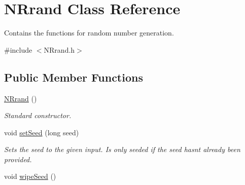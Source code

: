 \hypertarget{class_n_rrand}{}\section{N\+Rrand Class Reference}
\label{class_n_rrand}


Contains the functions for random number generation.  




{\ttfamily \#include $<$N\+Rrand.\+h$>$}

\subsection*{Public Member Functions}
\begin{DoxyCompactItemize}
\item 
\hyperlink{class_n_rrand_a674521c4c29a6cb692f343ea9cf6a40c}{N\+Rrand} ()\hypertarget{class_n_rrand_a674521c4c29a6cb692f343ea9cf6a40c}{}\label{class_n_rrand_a674521c4c29a6cb692f343ea9cf6a40c}

\begin{DoxyCompactList}\small\item\em Standard constructor. \end{DoxyCompactList}\item 
void \hyperlink{class_n_rrand_a23325b4d35ee0b5b580726db05e2b8a3}{set\+Seed} (long seed)
\begin{DoxyCompactList}\small\item\em Sets the seed to the given input. Is only seeded if the seed hasn\textquotesingle{}t already been provided. \end{DoxyCompactList}\item 
void \hyperlink{class_n_rrand_a34238557ccd72ee3e58712b7140a649a}{wipe\+Seed} ()\hypertarget{class_n_rrand_a34238557ccd72ee3e58712b7140a649a}{}\label{class_n_rrand_a34238557ccd72ee3e58712b7140a649a}


\end{DoxyCompactItemize}
